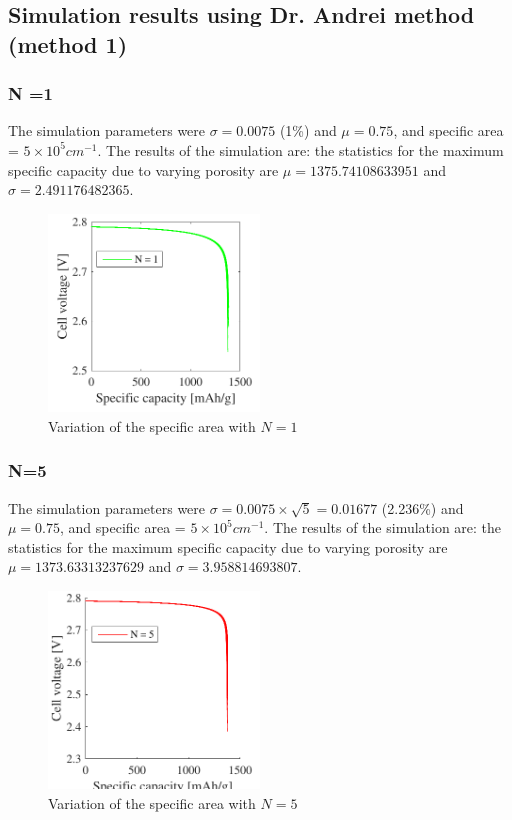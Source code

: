 \documentclass[12pt]{book}
\begin{document}
\subsection{Simulation results using Dr. Andrei method (method 1)}

\subsubsection{N =1}
The simulation parameters were $\sigma=0.0075$ (1\%) and $\mu=0.75$, and specific area = $5\times10^{5}cm^{-1}$. The results of the simulation are: the statistics for the maximum specific capacity due to varying porosity are $\mu=1375.74108633951$ and $\sigma=2.491176482365$.
\begin{figure}[htb]
	\centering
	\includegraphics[width=0.5\textwidth]{figures/Petru_N_1_012016}
	\caption{Variation of the specific area with $N = 1$}
\end{figure}
\subsubsection{N=5}
The simulation parameters were $\sigma=0.0075\times\sqrt{5}=0.01677$ (2.236\%) and $\mu=0.75$, and specific area = $5\times10^{5}cm^{-1}$. The results of the simulation are: the statistics for the maximum specific capacity due to varying porosity are $\mu=1373.63313237629$ and $\sigma=3.958814693807$.
\begin{figure}[htb]
	\centering
	\includegraphics[width=0.5\textwidth]{figures/Petru_N_5_012016}
	\caption{Variation of the specific area with $N = 5$}
\end{figure}
\end{document}
